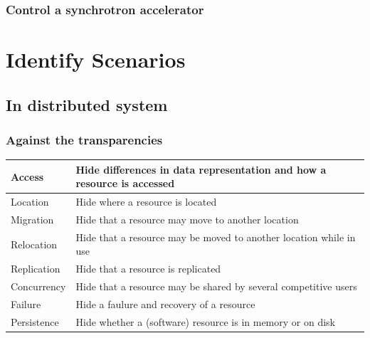 \documentclass{beamer}
\begin{document}
\begin{frame}
\frametitle{Control a synchrotron accelerator}
\end{frame}

\section{Identify Scenarios}

\subsection{In distributed system}

\begin{frame}
\frametitle{Against the transparencies}
    \begin{tabular}{|l|l|}
        \hline
        Access & Hide differences in data representation and how a resource is accessed \\ \hline
        Location & Hide where a resource is located \\ \hline
        Migration & Hide that a resource may move to another location \\ \hline
        Relocation & Hide that a resource may be moved to another location while in use \\ \hline
        Replication & Hide that a resource is replicated \\ \hline
        Concurrency & Hide that a resource may be shared by several competitive users \\ \hline
        Failure & Hide a faulure and recovery of a resource \\ \hline
        Persistence & Hide whether a (software) resource is in memory or on disk \\ \hline
    \end{tabular}
\end{frame}
\end{document}
